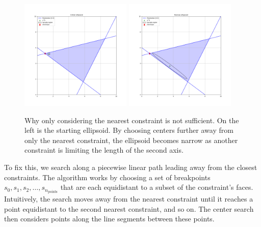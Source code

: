 \documentclass{article}
\begin{document}
\begin{figure}[ht]
    \centering
    \includegraphics[width=200px]{images/narrow_ellipsoid_1.png}
    \includegraphics[width=200px]{images/narrow_ellipsoid_2.png}
    \caption[Why only considering the nearest constraint is not sufficient. ]
        {Why only considering the nearest constraint is not sufficient.   On the left is the starting ellipsoid.
    	By choosing centers further away from only the nearest constraint, the ellipsoid becomes narrow as another constraint is limiting the length of the second axis.
	}
    \label{first_line_search}
\end{figure}

To fix this, we search along a piecewise linear path leading away from the closest constraints.   
The algorithm works by choosing a set of breakpoints $s_0, s_1, s_2, \ldots, s_{n_{\text{points}}}$
that are each equidistant to a subset of the constraint's faces.
Intuitively, the search moves away from the nearest constraint until it reaches a point equidistant to the second nearest constraint, and so on.
The center search then considers points along the line segments between these points.
\end{document}
